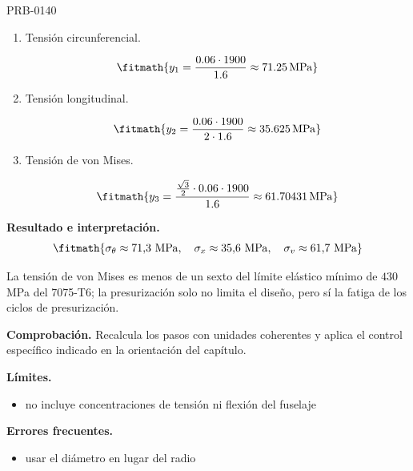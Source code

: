 \begin{studiumworked}{PRB-0140}
\begin{enumerate}
\item Tensión circunferencial.

\[\fitmath{y_{1}=\frac{0.06\cdot 1900}{1.6}\approx 71.25\,\mathrm{MPa}}\]

\item Tensión longitudinal.

\[\fitmath{y_{2}=\frac{0.06\cdot 1900}{2\cdot 1.6}\approx 35.625\,\mathrm{MPa}}\]

\item Tensión de von Mises.

\[\fitmath{y_{3}=\frac{\frac{\sqrt{3}}{2}\cdot 0.06\cdot 1900}{1.6}\approx 61.70431\,\mathrm{MPa}}\]

\end{enumerate}

\textbf{Resultado e interpretación.}\[\fitmath{\sigma_\theta \approx 71{,}3\ \mathrm{MPa},\quad \sigma_x \approx 35{,}6\ \mathrm{MPa},\quad \sigma_v \approx 61{,}7\ \mathrm{MPa}}\]

La tensión de von Mises es menos de un sexto del límite elástico mínimo de $430$ MPa del 7075-T6; la presurización solo no limita el diseño, pero sí la fatiga de los ciclos de presurización.

\par\textbf{Comprobación.} Recalcula los pasos con unidades coherentes y aplica el control específico indicado en la orientación del capítulo.

\textbf{Límites.}\begin{itemize}\item no incluye concentraciones de tensión ni flexión del fuselaje\end{itemize}

\textbf{Errores frecuentes.}\begin{itemize}\item usar el diámetro en lugar del radio\end{itemize}

\end{studiumworked}

\Needspace{.3\textheight}


